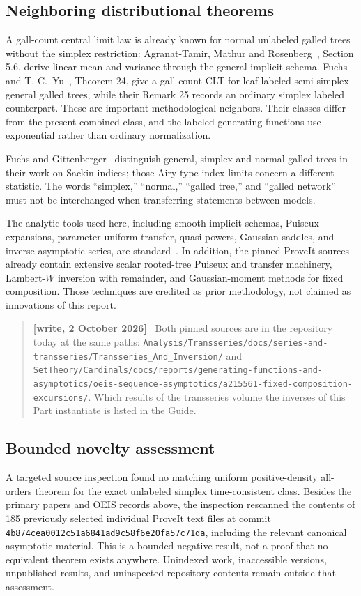 \documentclass[11pt,letterpaper]{article}
\numberwithin{equation}{section}
\theoremstyle{definition}\newtheorem{definition}[theorem]{Definition}
\theoremstyle{remark}\newtheorem{remark}[theorem]{Remark}
\newenvironment{writenote}{\par\smallskip\begin{quote}\small\textbf{[write, 2 October 2026]}\ }{\end{quote}\smallskip}
\newcommand{\repopath}[1]{\nolinkurl{#1}}
\begin{document}
\subsection{Neighboring distributional theorems}
A gall-count central limit law is already known for normal unlabeled galled trees without the simplex restriction: Agranat-Tamir, Mathur and Rosenberg~\cite{normal2024}, Section 5.6, derive linear mean and variance through the general implicit schema. Fuchs and T.-C.~Yu~\cite{semisimplex}, Theorem 24, give a gall-count CLT for leaf-labeled semi-simplex general galled trees, while their Remark 25 records an ordinary simplex labeled counterpart. These are important methodological neighbors. Their classes differ from the present combined class, and the labeled generating functions use exponential rather than ordinary normalization.

Fuchs and Gittenberger~\cite{sackin} distinguish general, simplex and normal galled trees in their work on Sackin indices; those Airy-type index limits concern a different statistic. The words ``simplex,'' ``normal,'' ``galled tree,'' and ``galled network'' must not be interchanged when transferring statements between models.

The analytic tools used here, including smooth implicit schemas, Puiseux expansions, parameter-uniform transfer, quasi-powers, Gaussian saddles, and inverse asymptotic series, are standard~\cite{FS,Drmota}. In addition, the pinned ProveIt sources~\cite{proveittrans,proveitcomposition} already contain extensive scalar rooted-tree Puiseux and transfer machinery, Lambert-$W$ inversion with remainder, and Gaussian-moment methods for fixed composition. Those techniques are credited as prior methodology, not claimed as innovations of this report.
\begin{writenote}
Both pinned sources are in the repository today at the same paths: \repopath{Analysis/Transseries/docs/series-and-transseries/Transseries_And_Inversion/} and \repopath{SetTheory/Cardinals/docs/reports/generating-functions-and-asymptotics/oeis-sequence-asymptotics/a215561-fixed-composition-excursions/}. Which results of the transseries volume the inverses of this Part instantiate is listed in the Guide.
\end{writenote}

\subsection{Bounded novelty assessment}
A targeted source inspection found no matching uniform positive-density all-orders theorem for the exact unlabeled simplex time-consistent class. Besides the primary papers and OEIS records above, the inspection rescanned the contents of 185 previously selected individual ProveIt text files at commit \texttt{4b874cea}\allowbreak\texttt{0012c51a6841ad9c58f6e20fa57c71da}, including the relevant canonical asymptotic material. This is a bounded negative result, not a proof that no equivalent theorem exists anywhere. Unindexed work, inaccessible versions, unpublished results, and uninspected repository contents remain outside that assessment.
\end{document}
